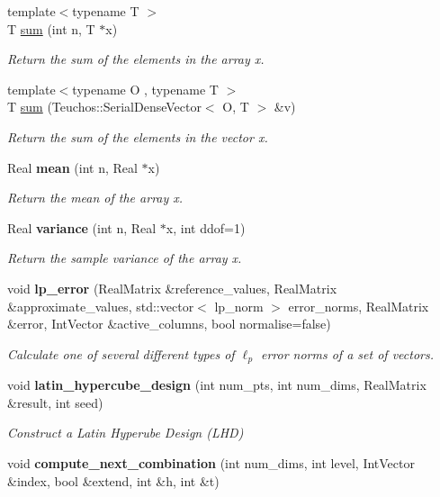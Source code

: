 \begin{DoxyCompactItemize}
\item 
{\footnotesize template$<$typename T $>$ }\\T \hyperlink{MathTools_8hpp_ad797845782ceb94ba49a0e99685c1693}{sum} (int n, T $\ast$x)
\begin{DoxyCompactList}\small\item\em Return the sum of the elements in the array x. \end{DoxyCompactList}\item 
{\footnotesize template$<$typename O , typename T $>$ }\\T \hyperlink{MathTools_8hpp_a0c1d929851ac321e7d78f4392f770b3d}{sum} (Teuchos\+::\+Serial\+Dense\+Vector$<$ O, T $>$ \&v)
\begin{DoxyCompactList}\small\item\em Return the sum of the elements in the vector x. \end{DoxyCompactList}\item 
Real {\bfseries mean} (int n, Real $\ast$x)
\begin{DoxyCompactList}\small\item\em Return the mean of the array x. \end{DoxyCompactList}\item 
Real {\bfseries variance} (int n, Real $\ast$x, int ddof=1)
\begin{DoxyCompactList}\small\item\em Return the sample variance of the array x. \end{DoxyCompactList}\item 
void {\bfseries lp\+\_\+error} (Real\+Matrix \&reference\+\_\+values, Real\+Matrix \&approximate\+\_\+values, std\+::vector$<$ lp\+\_\+norm $>$ error\+\_\+norms, Real\+Matrix \&error, Int\+Vector \&active\+\_\+columns, bool normalise=false)
\begin{DoxyCompactList}\small\item\em Calculate one of several different types of $\ell_p$ error norms of a set of vectors. \end{DoxyCompactList}\item 
void {\bfseries latin\+\_\+hypercube\+\_\+design} (int num\+\_\+pts, int num\+\_\+dims, Real\+Matrix \&result, int seed)\label{MathTools_8cpp_a8625933001446106e49a0bfbcc3e5ab8}

\begin{DoxyCompactList}\small\item\em Construct a Latin Hyperube Design (L\+HD) \end{DoxyCompactList}\item 
void {\bfseries compute\+\_\+next\+\_\+combination} (int num\+\_\+dims, int level, Int\+Vector \&index, bool \&extend, int \&h, int \&t)\label{MathTools_8cpp_aaf9fa0051222cece664834a29a049519}


\end{DoxyCompactItemize}
